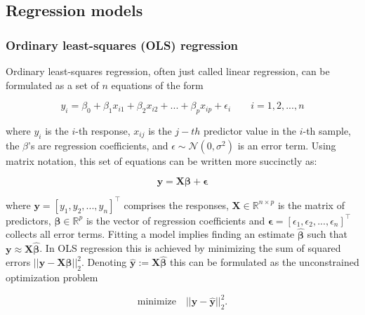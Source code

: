 \documentclass[utf8]{frontiersSCNS} %
\renewcommand{\a}{\theta}
\renewcommand{\b}{\boldsymbol{\beta}} %
\newcommand{\bh}{\boldsymbol{\hat{\beta}}} %
\newcommand{\eps}{\boldsymbol{\epsilon}}
\newcommand{\N}{\mathcal{N}}   %
\newcommand{\R}{\mathbb{R}}
\newcommand{\X}{\mathbf{X}}
\newcommand{\y}{\mathbf{y}}
\newcommand{\yh}{\mathbf{\hat{y}}}
\begin{document}

\subsection{Regression models}\label{sec:regression_models}

\subsubsection{Ordinary least-squares (OLS) regression}

Ordinary least-squares regression, often just called linear regression, can be formulated as a set of $n$ equations of the form

\[
y_i = \beta_0 + \beta_1 x_{i1}+ \beta_2 x_{i2} + ... + \beta_p x_{ip} + \epsilon_i\quad\quad i=1, 2, ..., n
\]

where $y_i$ is the $i$-th response, $x_{ij}$ is the $j-th$ predictor value in the $i$-th sample, the $\beta$'s are regression coefficients, and  $\epsilon\sim\N(0,\sigma^2)$ is an error term. Using matrix notation, this set of equations can be written more succinctly as:

\begin{equation}\label{eq:linear_regression}
\y = \X\b + \eps
\end{equation}

where $\y=[y_1, y_2, ..., y_n]^\top$ comprises the responses, $\X\in\R^{n\times p}$ is the matrix of predictors, $\b\in\R^p$ is the vector of regression coefficients and 
$\eps=[\epsilon_1,\epsilon_2,...,\epsilon_n]^\top$ collects all error terms. Fitting a model implies finding an estimate $\bh$ such that $\y\approx\X\bh$. In OLS regression this is achieved by minimizing the sum of squared errors $||\y-\X\b||_2^2$. Denoting $\yh := \X\bh$ this can be formulated as the unconstrained optimization problem

\begin{equation}\label{eq:ols_optimization_problem}
\text{minimize}\quad ||\y-\yh||_2^2.
\end{equation}
\end{document}
